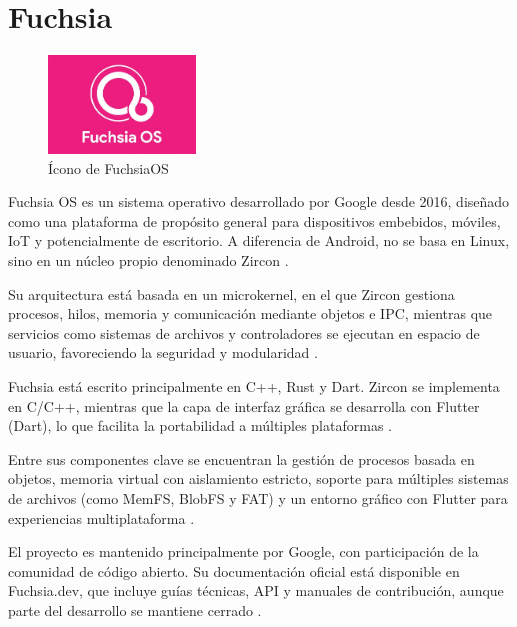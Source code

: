 \section{Fuchsia}

\begin{figure}[H]
    \centering
    \includegraphics[width=0.35\textwidth]{figures/fuchsia.jpeg}
    \caption[Ícono de FuchsiaOS]%
            {Ícono de FuchsiaOS \citep{fuchsia2025}}
    \label{fig:fuchsia}
\end{figure}

Fuchsia OS es un sistema operativo desarrollado por Google desde 2016, diseñado como una plataforma de propósito general para dispositivos embebidos, móviles, IoT y potencialmente de escritorio. A diferencia de Android, no se basa en Linux, sino en un núcleo propio denominado Zircon \citep{zirconkernel}.  

Su arquitectura está basada en un microkernel, en el que Zircon gestiona procesos, hilos, memoria y comunicación mediante objetos e IPC, mientras que servicios como sistemas de archivos y controladores se ejecutan en espacio de usuario, favoreciendo la seguridad y modularidad \citep{fuchsiadocs}.  

Fuchsia está escrito principalmente en C++, Rust y Dart. Zircon se implementa en C/C++, mientras que la capa de interfaz gráfica se desarrolla con Flutter (Dart), lo que facilita la portabilidad a múltiples plataformas \citep{googlefuchsia}.  

Entre sus componentes clave se encuentran la gestión de procesos basada en objetos, memoria virtual con aislamiento estricto, soporte para múltiples sistemas de archivos (como MemFS, BlobFS y FAT) y un entorno gráfico con Flutter para experiencias multiplataforma \citep{zirconkernel}.  

El proyecto es mantenido principalmente por Google, con participación de la comunidad de código abierto. Su documentación oficial está disponible en Fuchsia.dev, que incluye guías técnicas, API y manuales de contribución, aunque parte del desarrollo se mantiene cerrado \citep{fuchsiacommunity}.
